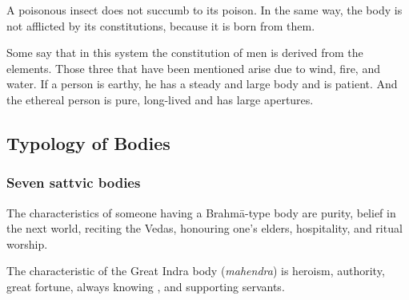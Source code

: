 \begin{translation}
\item[79]

\begin{sloka}
A poisonous insect does not succumb to its poison.  In the same way, the body is not afflicted by its constitutions, because it is born from them.
\end{sloka}
        
%


\item[80]

Some say that in this system %
the constitution of men is derived from the elements. Those three that have been mentioned arise due to wind, fire, and water. If a person is earthy, he has a steady and large body and is patient. %
And the ethereal person %
is pure, long-lived and has large apertures. %
\newpage

\subsection{Typology of Bodies}

\subsubsection{Seven sattvic bodies}

\item[81]

The characteristics of someone having a Brahmā-type body are 
purity, belief in the next world, %
reciting the Vedas, %
honouring one's elders, %
hospitality, %
and ritual worship. %




\item[82]

The characteristic of the Great Indra body (\emph{mahendra}) is heroism, authority, great fortune, always knowing , and supporting servants.  

\item[83]


\end{translation}
